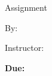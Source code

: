     \begin{titlepage}
        \centering
        {\vspace*{4.5cm}}
        {\huge \course \par \semester \par}
        \vspace{0.5cm}
        {\Large Assignment \assignmentnumber \par}
        \vspace{0.5cm}
        {\large By: \name  \par }
        \vspace{1cm}
        Instructor: \instructor \par
        \school \par

        \vfill

        {\large \textbf{Due:} \duedate  \par}
        \vspace{0.5cm}

    \end{titlepage}




